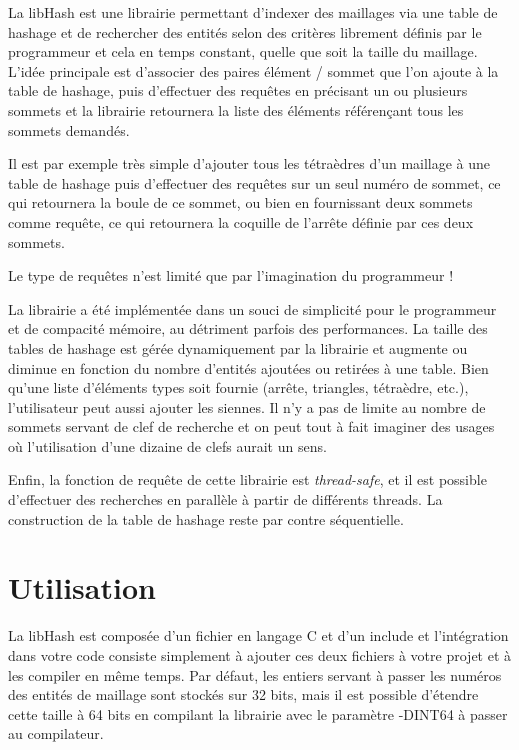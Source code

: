 \documentclass[a4paper,12pt]{article}
\begin{document}
La libHash est une librairie permettant d'indexer des maillages via une table de hashage et de rechercher des entités selon des critères librement définis par le programmeur et cela en temps constant, quelle que soit la taille du maillage.
L'idée principale est d'associer des paires élément / sommet que l'on ajoute à la table de hashage, puis d'effectuer des requêtes en précisant un ou plusieurs sommets et la librairie retournera la liste des éléments référençant tous les sommets demandés.

Il est par exemple très simple d'ajouter tous les tétraèdres d'un maillage à une table de hashage puis d'effectuer des requêtes sur un seul numéro de sommet, ce qui retournera la boule de ce sommet, ou bien en fournissant deux sommets comme requête, ce qui retournera la coquille de l'arrête définie par ces deux sommets.

Le type de requêtes n'est limité que par l'imagination du programmeur !

La librairie a été implémentée dans un souci de simplicité pour le programmeur et de compacité mémoire, au détriment parfois des performances.
La taille des tables de hashage est gérée dynamiquement par la librairie et augmente ou diminue en fonction du nombre d'entités ajoutées ou retirées à une table.
Bien qu'une liste d'éléments types soit fournie (arrête, triangles, tétraèdre, etc.), l'utilisateur peut aussi ajouter les siennes.
Il n'y a pas de limite au nombre de sommets servant de clef de recherche et on peut tout à fait imaginer des usages où l'utilisation d'une dizaine de clefs aurait un sens.

Enfin, la fonction de requête de cette librairie est \emph{thread-safe}, et il est possible d'effectuer des recherches en parallèle à partir de différents threads.
La construction de la table de hashage reste par contre séquentielle.


%
%

\section{Utilisation}

La libHash est composée d'un fichier en langage C et d'un include et l'intégration dans votre code consiste simplement à ajouter ces deux fichiers à votre projet et à les compiler en même temps.
Par défaut, les entiers servant à passer les numéros des entités de maillage sont stockés sur 32 bits, mais il est possible d'étendre cette taille à 64 bits en compilant la librairie avec le paramètre -DINT64 à passer au compilateur.
\end{document}
